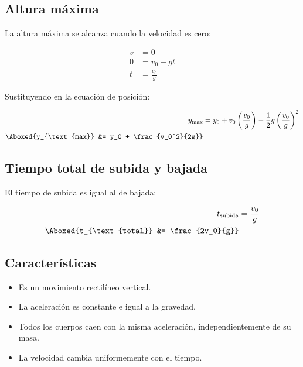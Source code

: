 \subsection{Altura máxima}

La altura máxima se alcanza cuando la velocidad es cero:

\vspace{-30pt}
\begin{align*}
v &= 0 \\
0 &= v_0 - gt \\
t &= \frac{v_0}{g}
\end{align*}

Sustituyendo en la ecuación de posición:

\vspace{-20pt}

\begin{align*}
y_{\text{max}} &= y_0 + v_0\left(\frac{v_0}{g}\right) - \frac{1}{2}g\left(\frac{v_0}{g}\right)^2 \\
\Aboxed{y_{\text{max}} &= y_0 + \frac{v_0^2}{2g}}
\end{align*}

\subsection{Tiempo total de subida y bajada}

El tiempo de subida es igual al de bajada:

\vspace{-20pt}

\begin{align*}
t_{\text{subida}} &= \frac{v_0}{g} \\
\Aboxed{t_{\text{total}} &= \frac{2v_0}{g}}
\end{align*}

\subsection{Características}

\begin{itemize}
    \setlength{\itemsep}{0pt}
    \item Es un movimiento rectilíneo vertical.
    \item La aceleración es constante e igual a la gravedad.
    \item Todos los cuerpos caen con la misma aceleración, independientemente de su masa.
    \item La velocidad cambia uniformemente con el tiempo.
\end{itemize}